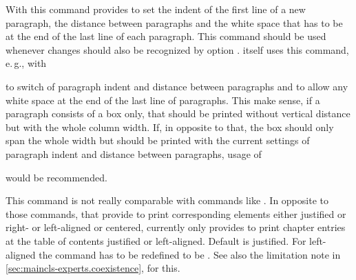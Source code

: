\begin{Declaration}
\end{Declaration}
%
With this command \KOMAScript{} provides to set the indent of the first line
of a new paragraph, the distance between paragraphs and the white space that
has to be at the end of the last line of each paragraph. This command should
be used whenever changes should also be recognized by option
. \KOMAScript{} itself uses
this command, e.\,g., with
\begin{lstcode}[belowskip=\dp\strutbox plus 1ex]
\end{lstcode}
to switch of paragraph indent and distance between paragraphs and to allow any
white space at the end of the last line of paragraphs. This make sense, if a
paragraph consists of a box only, that should be printed without vertical
distance but with the whole column width. If, in opposite to that, the box
should only span the whole width but should be printed with the current
settings of paragraph indent and distance between paragraphs, usage of
\begin{lstcode}[belowskip=\dp\strutbox plus 1ex]
  \setlength{\parfillskip}{0pt plus 1fil}
\end{lstcode}
would be recommended.%
%
%

\begin{Declaration}
\end{Declaration}
%
This command is not really comparable with commands like
. In opposite to those commands, that provide to print
corresponding elements either justified or right- or left-aligned or centered,
 currently only provides to print chapter entries at
the table of contents justified or left-aligned. Default is justified. For
left-aligned the command has to be redefined to be
. See
also the limitation note in \autoref{sec:maincls-experts.coexistence},
 for this.%
%

